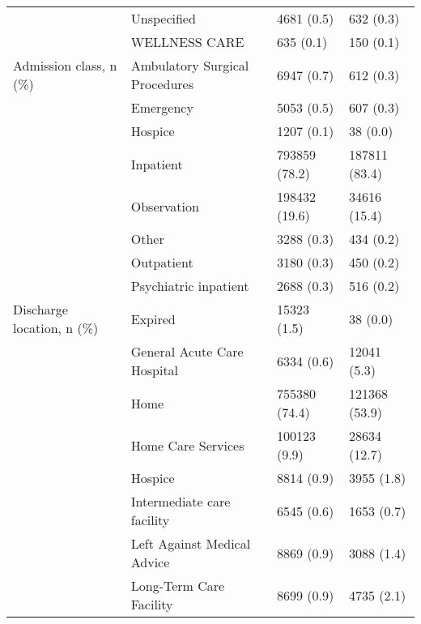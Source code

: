 \begin{tabular}{llll}
                                       & Unspecified &               4681 (0.5) &         632 (0.3) \\
                                       & WELLNESS CARE &                635 (0.1) &         150 (0.1) \\
Admission class, n (\%) & Ambulatory Surgical Procedures &               6947 (0.7) &         612 (0.3) \\
                                       & Emergency &               5053 (0.5) &         607 (0.3) \\
                                       & Hospice &               1207 (0.1) &          38 (0.0) \\
                                       & Inpatient &            793859 (78.2) &     187811 (83.4) \\
                                       & Observation &            198432 (19.6) &      34616 (15.4) \\
                                       & Other &               3288 (0.3) &         434 (0.2) \\
                                       & Outpatient &               3180 (0.3) &         450 (0.2) \\
                                       & Psychiatric inpatient &               2688 (0.3) &         516 (0.2) \\
Discharge location, n (\%) & Expired &              15323 (1.5) &          38 (0.0) \\
                                       & General Acute Care Hospital &               6334 (0.6) &       12041 (5.3) \\
                                       & Home &            755380 (74.4) &     121368 (53.9) \\
                                       & Home Care Services &             100123 (9.9) &      28634 (12.7) \\
                                       & Hospice &               8814 (0.9) &        3955 (1.8) \\
                                       & Intermediate care facility &               6545 (0.6) &        1653 (0.7) \\
                                       & Left Against Medical Advice &               8869 (0.9) &        3088 (1.4) \\
                                       & Long-Term Care Facility &               8699 (0.9) &        4735 (2.1) \\

\end{tabular}
